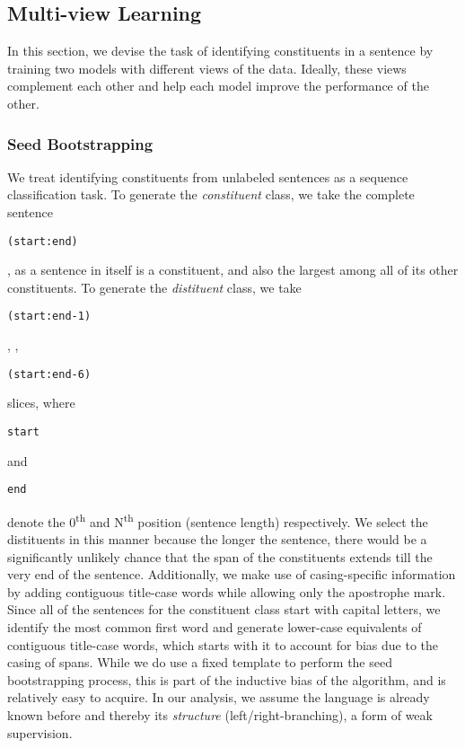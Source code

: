 \documentclass[11pt]{article}
\begin{document}
\subsection{Multi-view Learning}
\label{ssec:multi-view-learning}
In this section, we devise the task of identifying constituents in a sentence by training two models with different views of the data. Ideally, these views complement each other and help each model improve the performance of the other.

\subsubsection{Seed Bootstrapping}
\label{ssec:seed-bootstrap}

We treat identifying constituents from unlabeled sentences as a sequence classification task. To generate the \emph{constituent} class, we take the complete sentence \begin{small}\texttt{(start:end)}\end{small}, as a sentence in itself is a constituent, and also the largest among all of its other constituents. To generate the \emph{distituent} class, we take \begin{small}\texttt{(start:end-1)}\end{small}, , \begin{small}\texttt{(start:end-6)}\end{small} slices, where \begin{small}{\texttt{start}}\end{small} and \begin{small}{\texttt{end}}\end{small} denote the 0\textsuperscript{th} and N\textsuperscript{th} position (sentence length) respectively. We select the distituents in this manner because the longer the sentence, there would be a significantly unlikely chance that the span of the constituents extends till the very end of the sentence.
Additionally, we make use of casing-specific information by adding contiguous title-case words while allowing only the apostrophe mark. Since all of the sentences for the constituent class start with capital letters, we identify the most common first word and generate lower-case equivalents of contiguous title-case words, which starts with it to account for bias due to the casing of spans. While we do use a fixed template to perform the seed bootstrapping process, this is part of the inductive bias of the algorithm, and is relatively easy to acquire. In our analysis, we assume the language is already known before and thereby its \emph{structure} (left/right-branching), a form of weak supervision.
\end{document}

